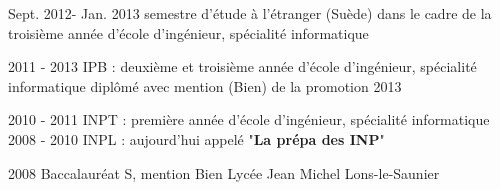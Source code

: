 \cventry
{Sept. 2012- Jan. 2013}
{}
{semestre d'étude à l'étranger (Suède) dans le cadre de la troisième année d'école d'ingénieur, spécialité informatique}
{}
{}
{	%
}


\vspace{-13pt}
\cventry
{2011 - 2013}
{IPB : }
{deuxième et troisième année d'école d'ingénieur, spécialité informatique}
{diplômé avec mention (Bien) de la promotion 2013}
{}
{	%
}

\vspace{-13pt}
\cventry
{2010 - 2011}
{INPT : }
{première année d'école d'ingénieur, spécialité informatique}
{}
{}
{	
}
\vspace{-13pt}
\cventry
{2008 - 2010}
{INPL : }
{aujourd'hui appelé "\textbf{La prépa des INP}"}
{}
{}
{}

\cventry
{2008}
{Baccalauréat S, mention Bien}
{Lycée Jean Michel}
{Lons-le-Saunier}
{}
{}

